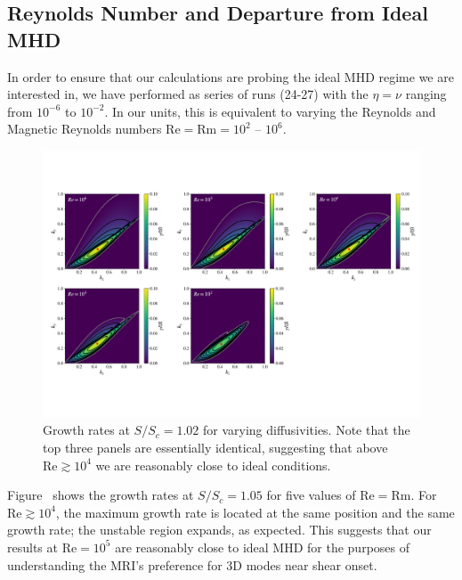 \documentclass[openacc]{rsproca_new}%
\newcommand{\SSC}{S/S_{c}}
\newcommand{\Reyn}{\mathrm{Re}}
\newcommand{\Reym}{\mathrm{Rm}}
\begin{document}
\subsection{Reynolds Number and Departure from Ideal MHD}
\label{sec:reyn}

In order to ensure that our calculations are probing the ideal MHD regime we are interested in, we have performed as series of runs (24-27) with the $\eta = \nu$ ranging from $10^{-6}$ to $10^{-2}$.
In our units, this is equivalent to varying the Reynolds and Magnetic Reynolds numbers $\Reyn = \Reym = 10^2$ -- $10^6$.
\begin{figure}[h!]
  \centering
  \includegraphics[width=\textwidth]{re_plots.pdf}
  \caption{Growth rates at $\SSC = 1.02$ for varying diffusivities. Note that the top three panels are essentially identical, suggesting that above $\Reyn \gtrsim 10^4$ we are reasonably close to ideal conditions.}
  \label{fig:reynolds}
\end{figure}
Figure~\pageref{fig:reynolds} shows the growth rates at $\SSC=1.05$ for five values of $\Reyn = \Reym$.
For $\Reyn \gtrsim 10^4$, the maximum growth rate is located at the same position and the same growth rate; the unstable region expands, as expected.
This suggests that our results at $\Reyn = 10^5$ are reasonably close to ideal MHD for the purposes of understanding the MRI's preference for 3D modes near shear onset.
\end{document}
